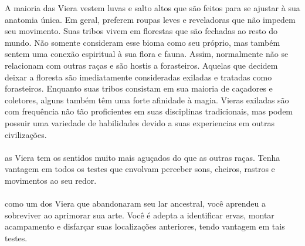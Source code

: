 A maioria das Viera vestem luvas e salto altos que são feitos para se ajustar à sua anatomia única.
Em geral, preferem roupas leves e reveladoras que não impedem seu movimento.
Suas tribos vivem em florestas que são fechadas ao resto do mundo.
Não somente consideram esse bioma como seu próprio, mas também sentem uma conexão espiritual à sua flora e fauna. 
Assim, normalmente não se relacionam com outras raças e são hostis a forasteiros.
Aquelas que decidem deixar a floresta são imediatamente consideradas exiladas e tratadas como forasteiros.
Enquanto suas tribos consistam em sua maioria de caçadores e coletores, alguns também têm uma forte afinidade à magia.
Vieras exiladas são com frequência não tão proficientes em suas disciplinas tradicionais, mas podem possuir uma variedade de habilidades devido a suas experiencias em outras civilizações.
%
\\\\
%
 as Viera tem os sentidos muito mais aguçados do que as outras raças. 
Tenha vantagem em todos os testes que envolvam perceber sons, cheiros, rastros e movimentos ao seu redor.
%
\\\\
%
 como um dos Viera que abandonaram seu lar ancestral, você aprendeu a sobreviver ao aprimorar sua arte. Você é adepta a identificar ervas, montar acampamento e disfarçar suas localizações anteriores, tendo vantagem em tais testes.
%
\clearpage
%
%
